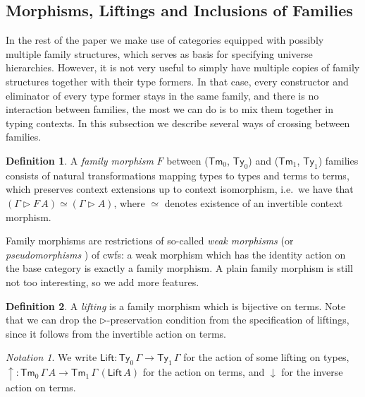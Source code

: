 \documentclass[a4paper,UKenglish,cleveref, autoref, thm-restate]{lipics-v2021}
\theoremstyle{remark}
\newtheorem{notation}{Notation}
\theoremstyle{definition}
\newtheorem{mydefinition}{Definition}
\newcommand{\Ty}{\mathsf{Ty}}
\newcommand{\Tm}{\mathsf{Tm}}
\newcommand{\ext}{\triangleright}
\newcommand{\up}{\uparrow}
\newcommand{\down}{\downarrow}
\newcommand{\Lift}{\mathsf{Lift}}
\begin{document}
\subsection{Morphisms, Liftings and Inclusions of Families}
\label{sec:morphisms}

In the rest of the paper we make use of categories equipped with possibly
multiple family structures, which serves as basis for specifying universe
hierarchies. However, it is not very useful to simply have multiple copies of
family structures together with their type formers. In that case, every
constructor and eliminator of every type former stays in the same family, and
there is no interaction between families, the most we can do is to mix them
together in typing contexts. In this subsection we describe several ways of
crossing between families.

\begin{mydefinition}
A \emph{family morphism} $F$ between ($\Tm_0$, $\Ty_0$) and ($\Tm_1$, $\Ty_1$)
families consists of natural transformations mapping types to types and terms to
terms, which preserves context extensions up to context isomorphism, i.e.\ we
have that $(\Gamma \ext F\,A) \simeq (\Gamma \ext A)$, where $\simeq$ denotes
existence of an invertible context morphism.
\end{mydefinition}

Family morphisms are restrictions of so-called \emph{weak morphisms}
\cite{dependentrightadjoints} (or \emph{pseudomorphisms}
\cite{kaposi2019gluing}) of cwfs: a weak morphism which has the identity action
on the base category is exactly a family morphism. A plain family morphism is
still not too interesting, so we add more features.

\begin{mydefinition}
A \emph{lifting} is a family morphism which is bijective on terms. Note that
we can drop the $\ext$-preservation condition from the specification of
liftings, since it follows from the invertible action on terms.
\end{mydefinition}

\begin{notation}
We write $\Lift : \Ty_0\,\Gamma \to \Ty_1\,\Gamma$ for the action of some lifting
on types, $\up : \Tm_0\,\Gamma\,A \to \Tm_1\,\Gamma\,(\Lift\,A)$ for the action
on terms, and $\down$ for the inverse action on terms.
\end{notation}

\end{document}
